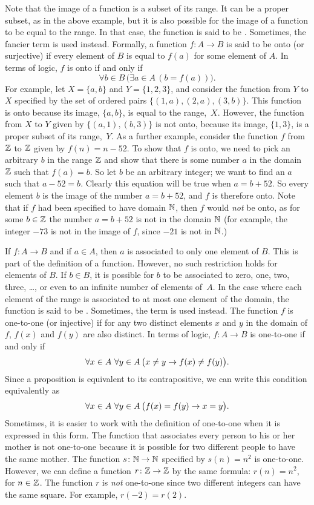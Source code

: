 Note that the image of a function is a subset of its range.
It can be a proper subset, as in the above example, but it is
also possible for the image of a function to be equal to
the range.  In that case, the function is said to be
.  Sometimes, the fancier term
 is used instead.  Formally, a function
$f\colon A\to B$ is said to be onto (or surjective) if
every element of $B$ is equal to $f(a)$ for some element of
$A$.  In terms of logic, $f$ is onto if and only if
\[\forall b\in B\,\big(\exists a\in A\, (b=f(a))\big).\]
For example, let $X=\{a,b\}$ and $Y=\{1,2,3\}$, and consider
the function from $Y$ to $X$ specified by the set of ordered
pairs $\{(1,a),(2,a),(3,b)\}$.  This function is onto because
its image, $\{a,b\}$, is equal to the range,~$X$. However,
the function from $X$ to $Y$ given by $\{(a,1),(b,3)\}$ is not
onto, because its image, $\{1,3\}$, is a proper subset of
its range,~$Y$.  As a further example, consider the function
$f$ from ${\mathbb Z}$ to ${\mathbb Z}$ given by $f(n) = n-52$.  To show that $f$
is onto, we need to pick an arbitrary $b$ in the range ${\mathbb Z}$
and show that there is some number $a$ in the domain ${\mathbb Z}$
such that $f(a) = b$.  So let $b$ be an arbitrary integer;
we want to find an $a$ such that $a-52=b$.  Clearly this equation
will be true when $a=b+52$.  So every element $b$ is the image
of the number $a=b+52$, and $f$ is therefore onto.  Note that if
$f$ had been specified to have domain ${\mathbb N}$, then $f$ would
\emph{not} be onto, as for some $b \in {\mathbb Z}$ the number $a=b+52$
is not in the domain ${\mathbb N}$ (for example, the integer $-73$ is
not in the image of $f$, since $-21$ is not in ${\mathbb N}$.)

If $f\colon A\to B$ and if $a\in A$, then $a$ is associated to
only one element of $B$.  This is part of the definition of
a function.  However, no such restriction holds for elements
of $B$.  If $b\in B$, it is possible for $b$ to be associated
to zero, one, two, three, \dots, or even to an infinite
number of elements of~$A$.  In the case where each element of
the range is associated to at most one element of the domain,
the function is said to be .  Sometimes,
the term  is used instead.  The function $f$
is one-to-one (or injective) if for any two distinct elements $x$ and $y$ in
the domain of $f$, $f(x)$ and $f(y)$ are also distinct.  In
terms of logic, $f\colon A\to B$ is one-to-one if and only if
\[\forall x\in A\,\,\forall y\in A\,\big(x\not=y\rightarrow f(x)\not=f(y)\big).\]
Since a proposition is equivalent to its contrapositive,
we can write this condition equivalently as
\[\forall x\in A\,\,\forall y\in A\,\big(f(x)=f(y)\rightarrow x=y\big).\]
Sometimes, it is easier to work with the definition of one-to-one
when it is expressed in this form.
The function that associates every person to his or her mother is
not one-to-one because it is possible for two different people
to have the same mother.  The function $s\colon{\mathbb N}\to{\mathbb N}$ specified
by $s(n)=n^2$ is one-to-one.  However,
we can define a function $r\colon{\mathbb Z}\to{\mathbb Z}$ by the same formula:
$r(n)=n^2$, for $n\in{\mathbb Z}$.  The function $r$ is \emph{not}
one-to-one since two different integers can have the same square.
For example, $r(-2)=r(2)$.

